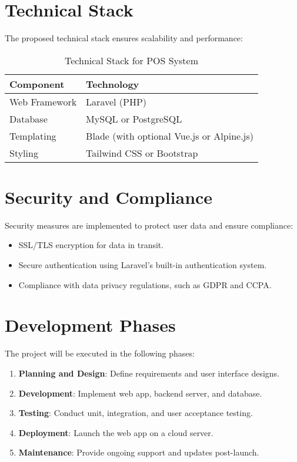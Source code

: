 \documentclass[a4paper,12pt]{article}
\begin{document}
\section{Technical Stack}
The proposed technical stack ensures scalability and performance:
\begin{table}[h]
    \centering
    \begin{tabular}{ll}
        \toprule
        \textbf{Component} & \textbf{Technology} \\
        \midrule
        Web Framework & Laravel (PHP) \\
        Database & MySQL or PostgreSQL \\
        Templating & Blade (with optional Vue.js or Alpine.js) \\
        Styling & Tailwind CSS or Bootstrap \\
        \bottomrule
    \end{tabular}
    \caption{Technical Stack for POS System}
\end{table}

\section{Security and Compliance}
Security measures are implemented to protect user data and ensure compliance:
\begin{itemize}
    \item SSL/TLS encryption for data in transit.
    \item Secure authentication using Laravel's built-in authentication system.
    \item Compliance with data privacy regulations, such as GDPR and CCPA.
\end{itemize}

\section{Development Phases}
The project will be executed in the following phases:
\begin{enumerate}
    \item \textbf{Planning and Design}: Define requirements and user interface designs.
    \item \textbf{Development}: Implement web app, backend server, and database.
    \item \textbf{Testing}: Conduct unit, integration, and user acceptance testing.
    \item \textbf{Deployment}: Launch the web app on a cloud server.
    \item \textbf{Maintenance}: Provide ongoing support and updates post-launch.
\end{enumerate}
\end{document}

